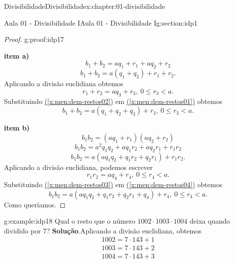 \documentclass[oneside,10pt,]{book}
\newcommand{\blocktitlefont}{\relax}
\newcommand{\xreffont}{\relax}
\newcommand{\terminology}[1]{\textbf{#1}}
\numberwithin{equation}{section}
\newcommand{\lt}{<}
\begin{document}
\begin{chapterptx}{Divisibilidade}{}{Divisibilidade}{}{}{x:chapter:01-divisibilidade}
\begin{sectionptx}{Aula 01 - Divisibilidade I}{}{Aula 01 - Divisibilidade I}{}{}{g:section:idp1}
\begin{proof}{}{g:proof:idp17}
\par
\terminology{item a)}%
\begin{equation*}
b_1+b_2 = aq_1+r_1 + aq_2+r_2
\end{equation*}
%
\begin{equation}
b_1+b_2= a(q_1+q_2) + r_1+r_2.\label{x:men:dem-restos01}
\end{equation}
 Aplicando a divisão euclidiana obtemos%
\begin{equation}
r_1+r_2 = aq_3 + r_3, ~ 0\leq r_3\lt a.\label{x:men:dem-restos02}
\end{equation}
Substituindo \hyperref[x:men:dem-restos02]{({\xreffont\ref{x:men:dem-restos02}})} em \hyperref[x:men:dem-restos01]{({\xreffont\ref{x:men:dem-restos01}})} obtemos%
\begin{equation*}
b_1+b_2 = a(q_1+q_2+q_3) + r_3, ~ 0\leq r_3\lt a.
\end{equation*}
%
\par
\terminology{item b)}%
\begin{equation*}
b_1b_2 = (aq_1+r_1)(aq_2+r_2)
\end{equation*}
%
\begin{equation*}
b_1b_2 = a^2q_1q_2+aq_1r_2+aq_2r_1+r_1r_2
\end{equation*}
%
\begin{equation}
b_1b_2 = a(aq_1q_2+q_1r_2+q_2r_1) + r_1r_2.\label{x:men:dem-restos03}
\end{equation}
Aplicando a divisão euclidiana, podemos escrever%
\begin{equation}
r_1r_2 = aq_4+r_4, ~ 0\leq r_4\lt a.\label{x:men:dem-restos04}
\end{equation}
Substituindo \hyperref[x:men:dem-restos03]{({\xreffont\ref{x:men:dem-restos03}})} em \hyperref[x:men:dem-restos04]{({\xreffont\ref{x:men:dem-restos04}})} obtemos%
\begin{equation*}
b_1b_2 = a(aq_1q_2+q_1r_2+q_2r_1 + q_4) + r_4, ~ 0\leq r_4\lt a.
\end{equation*}
Como queríamos.%
\end{proof}
\begin{example}{}{g:example:idp18}%
Qual o resto que o número \(1002\cdot1003\cdot1004\) deixa quando dividido por \(7\)?%
\textbf{\blocktitlefont Solução}.\hypertarget{g:solution:idp19}{}\quad{}Aplicando a divisão euclidiana, obtemos%
\begin{gather*}
1002 = 7\cdot 143+1\\
1003 = 7\cdot 143+2\\
1004 = 7\cdot 143+3
\end{gather*}

\end{example}
\end{sectionptx}
\end{chapterptx}
\end{document}
